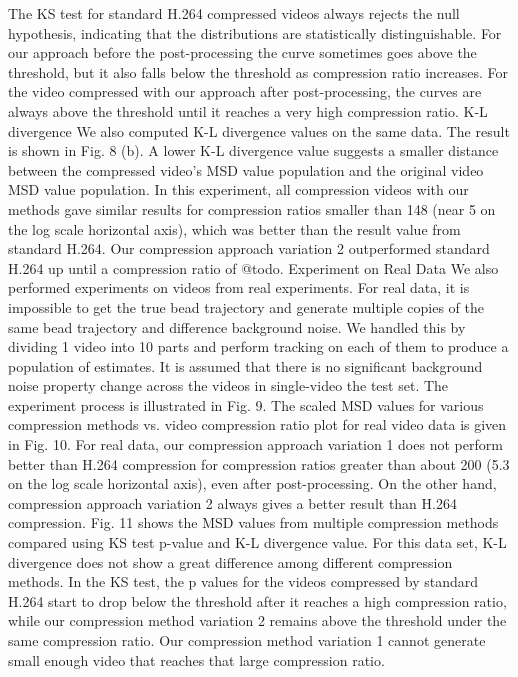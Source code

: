 The KS test for standard H.264 compressed videos always rejects the null hypothesis, indicating that the distributions are statistically distinguishable. For our approach before the post-processing the curve sometimes goes above the threshold, but it also falls below the threshold as compression ratio increases. For the video compressed with our approach after post-processing, the curves are always above the threshold until it reaches a very high compression ratio.
K-L divergence
We also computed K-L divergence values on the same data.  The result is shown in Fig. 8 (b). A lower K-L divergence value suggests a smaller distance between the compressed video’s MSD value population and the original video MSD value population.
In this experiment, all compression videos with our methods gave similar results for compression ratios smaller than 148 (near 5 on the log scale horizontal axis), which was better than the result value from standard H.264. Our compression approach variation 2 outperformed standard H.264 up until a compression ratio of @todo.
Experiment on Real Data
We also performed experiments on videos from real experiments. For real data, it is impossible to get the true bead trajectory and generate multiple copies of the same bead trajectory and difference background noise. We handled this by dividing 1 video into 10 parts and perform tracking on each of them to produce a population of estimates. It is assumed that there is no significant background noise property change across the videos in single-video the test set. The experiment process is illustrated in Fig. 9.
The scaled MSD values for various compression methods vs. video compression ratio plot for real video data is given in Fig. 10. For real data, our compression approach variation 1 does not perform better than H.264 compression for compression ratios greater than about 200 (5.3 on the log scale horizontal axis), even after post-processing. On the other hand, compression approach variation 2 always gives a better result than H.264 compression.
Fig. 11 shows the MSD values from multiple compression methods compared using KS test p-value and K-L divergence value. For this data set, K-L divergence does not show a great difference among different compression methods. In the KS test, the p values for the videos compressed by standard H.264 start to drop below the threshold after it reaches a high compression ratio, while our compression method variation 2 remains above the threshold under the same compression ratio. Our compression method variation 1 cannot generate small enough video that reaches that large compression ratio.
